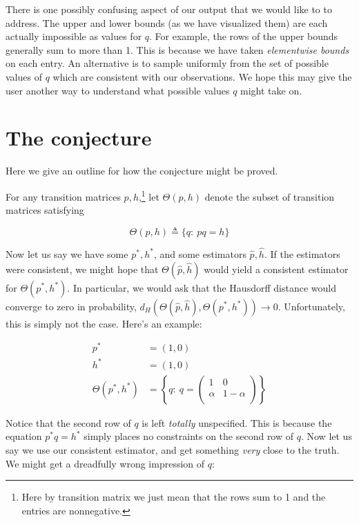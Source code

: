 There is one possibly confusing aspect of our output that we would like to to address.  The upper and lower bounds (as we have visualized them) are each actually impossible as values for $q$.  For example, the rows of the upper bounds generally sum to more than 1.  This is because we have taken \emph{elementwise bounds} on each entry.  An alternative is to  sample uniformly from the set of possible values of $q$ which are consistent with our observations.  We hope this may give the user another way to understand what possible values $q$ might take on.  




\section{The conjecture}

Here we give an outline for how the conjecture might be proved.

For any transition matrices $p,h$,\footnote{Here by transition matrix we just mean that the rows sum to 1 and the entries are nonnegative.} let $\Theta(p,h)$ denote the subset of transition matrices satisfying

\[
\Theta(p,h) \triangleq \{q:\ pq=h\}
\]

Now let us say we have some $p^*,h^*$, and some estimators $\hat p,\hat h$.  If the estimators were consistent, we might hope that $\Theta(\hat p,\hat h)$ would yield a consistent estimator for $\Theta(p^*,h^*)$.  In particular, we would ask that the Hausdorff distance would converge to zero in probability, $d_H(\Theta(\hat p,\hat h),\Theta(p^*,h^*))\rightarrow 0$.  Unfortunately, this is simply not the case.  Here's an example:

\begin{align*}
p^* &= (1, 0)\\
h^* &= (1, 0)\\
\Theta(p^*,h^*) &= 
  \left\{q:\ q=\left(\begin{array}{cc}
  1 & 0 \\
  \alpha & 1-\alpha \\
  \end{array}\right)\right\}
\end{align*}

Notice that the second row of $q$ is left \emph{totally} unspecified.  This is because the equation $p^*q=h^*$ simply places no constraints on the second row of $q$.  Now let us say we use our consistent estimator, and get something \emph{very} close to the truth.  We might get a dreadfully wrong impression of $q$:

